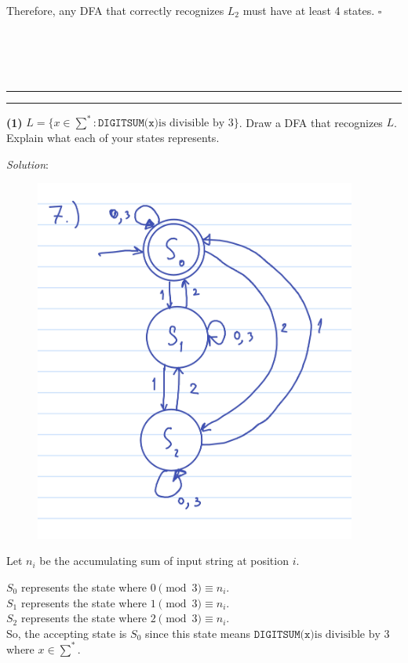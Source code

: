 \documentclass[a4paper, 11pt]{article}
\newcommand{\question}[2] {\vspace{.25in} \hrule\vspace{0.5em}
	\noindent{\bf #1: #2} \vspace{0.5em}
	\hrule \vspace{.10in}}
\renewcommand{\part}[1] {\vspace{.10in} {\bf (#1)}}
\begin{document}
	Therefore, any DFA that correctly recognizes $L_2$ must have at least 4 states. $\square$
	\\\\\\\\\\
	\question{7}{Digit Sum}
	\part{1} $L = \{x \in \sum^{*}: \texttt{DIGITSUM(x)} \text{is divisible by 3}\}$. Draw a DFA that recognizes $L$. Explain what each of your states represents.
	
	{\em Solution}:
	\begin{figure}[htbp]
		\centering
		\includegraphics[width=400px]{figures/5.jpg}
	\end{figure}
	
	Let $n_i$ be the accumulating sum of input string at position $i$.
	
	$S_0$ represents the state where $0 \pmod{3} \equiv n_i$.\\
	$S_1$ represents the state where $1 \pmod{3} \equiv n_i$.\\
	$S_2$ represents the state where $2 \pmod{3} \equiv n_i$.\\
	
	So, the accepting state is $S_0$ since this state means $\texttt{DIGITSUM(x)} \text{is divisible by 3}$ where $x \in \sum^{*}$.
\end{document}
